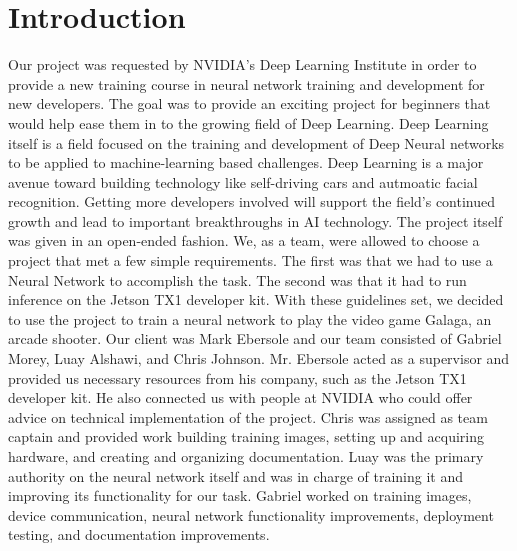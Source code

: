 \documentclass[onecolumn, draftclsnofoot,10pt, compsoc]{IEEEtran}
\begin{document}
\newpage
{}
\tableofcontents

\section{Introduction}
Our project was requested by NVIDIA's Deep Learning Institute in order to provide a new training course in neural network training and development for new developers.
The goal was to provide an exciting project for beginners that would help ease them in to the growing field of Deep Learning.
Deep Learning itself is a field focused on the training and development of Deep Neural networks to be applied to machine-learning based challenges.
Deep Learning is a major avenue toward building technology like self-driving cars and autmoatic facial recognition. 
Getting more developers involved will support the field's continued growth and lead to important breakthroughs in AI technology.
\newline\newline
The project itself was given in an open-ended fashion.
We, as a team, were allowed to choose a project that met a few simple requirements.
The first was that we had to use a Neural Network to accomplish the task. 
The second was that it had to run inference on the Jetson TX1 developer kit.
With these guidelines set, we decided to use the project to train a neural network to play the video game Galaga, an arcade shooter.
\newline\newline
Our client was Mark Ebersole and our team consisted of Gabriel Morey, Luay Alshawi, and Chris Johnson. 
Mr. Ebersole acted as a supervisor and provided us necessary resources from his company, such as the Jetson TX1 developer kit.
He also connected us with people at NVIDIA who could offer advice on technical implementation of the project.
Chris was assigned as team captain and provided work building training images, setting up and acquiring hardware, and creating and organizing documentation.
Luay was the primary authority on the neural network itself and was in charge of training it and improving its functionality for our task.
Gabriel worked on training images, device communication, neural network functionality improvements, deployment testing, and documentation improvements.

\end{document}
